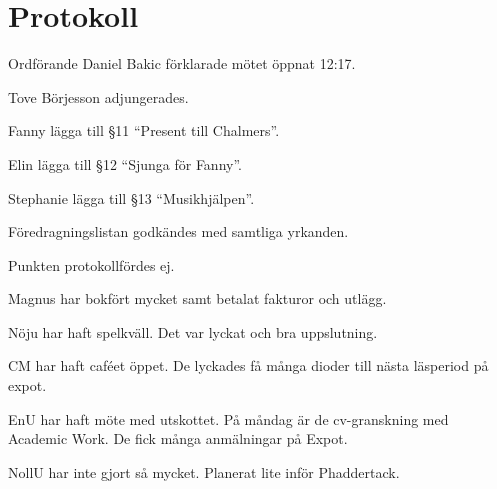 \documentclass[10pt]{article}
\def\mo{Daniel Bakic}
\begin{document}
\section*{Protokoll}
\begin{paragrafer}
	Ordförande {\mo} förklarade mötet öppnat 12:17.

	{\valavmo}

	{\valavms}

	{\valavj}

	{\tosg}

	Tove Börjesson adjungerades.

	Fanny \ypa lägga till \S11 ``Present till Chalmers''.
	
	Elin \ypa lägga till \S12 ``Sjunga för Fanny''.
	
	Stephanie \ypa lägga till \S13 ``Musikhjälpen''.

	Föredragningslistan godkändes med samtliga yrkanden.


	\begin{fyllnadsval} %
	\end{fyllnadsval}

	\begin{paragrafer}
		Punkten protokollfördes ej.


		Magnus har bokfört mycket samt betalat fakturor och utlägg.
		
		Nöju har haft spelkväll. Det var lyckat och bra uppslutning.
		
		CM har haft caféet öppet. De lyckades få många dioder till nästa läsperiod på expot.
		
		EnU har haft möte med utskottet. På måndag är de cv-granskning med Academic Work. De fick många anmälningar på Expot.
		
		NollU har inte gjort så mycket. Planerat lite inför Phaddertack.
		

\end{paragrafer}
\end{paragrafer}
\end{document}
